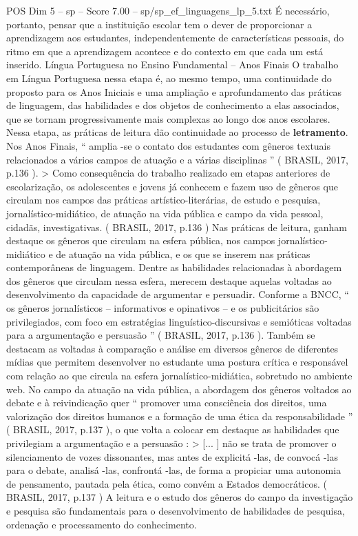 \begin{textsample}{POS Dim 5 – sp – Score 7.00 – sp/sp\_ef\_linguagens\_lp\_5.txt}
É necessário, portanto, pensar que a instituição escolar tem o dever de proporcionar a aprendizagem aos estudantes, independentemente de características pessoais, do ritmo em que a aprendizagem acontece e do contexto em que cada um está inserido.
Língua Portuguesa no Ensino Fundamental – Anos Finais O trabalho em Língua Portuguesa nessa etapa é, ao mesmo tempo, uma continuidade do proposto para os Anos Iniciais e uma ampliação e aprofundamento das práticas de linguagem, das habilidades e dos objetos de conhecimento a elas associados, que se tornam progressivamente mais complexas ao longo dos anos escolares.
Nessa etapa, as práticas de leitura dão continuidade ao processo de \textbf{letramento}.
Nos Anos Finais, “ amplia -se o contato dos estudantes com gêneros textuais relacionados a vários campos de atuação e a várias disciplinas ” ( BRASIL, 2017, p.136 ). > Como consequência do trabalho realizado em etapas anteriores de escolarização, os adolescentes e jovens já conhecem e fazem uso de gêneros que circulam nos campos das práticas artístico-literárias, de estudo e pesquisa, jornalístico-midiático, de atuação na vida pública e campo da vida pessoal, cidadãs, investigativas. ( BRASIL, 2017, p.136 ) Nas práticas de leitura, ganham destaque os gêneros que circulam na esfera pública, nos campos jornalístico-midiático e de atuação na vida pública, e os que se inserem nas práticas contemporâneas de linguagem.
Dentre as habilidades relacionadas à abordagem dos gêneros que circulam nessa esfera, merecem destaque aquelas voltadas ao desenvolvimento da capacidade de argumentar e persuadir.
Conforme a BNCC, “ os gêneros jornalísticos – informativos e opinativos – e os publicitários são privilegiados, com foco em estratégias linguístico-discursivas e semióticas voltadas para a argumentação e persuasão ” ( BRASIL, 2017, p.136 ).
Também se destacam as voltadas à comparação e análise em diversos gêneros de diferentes mídias que permitem desenvolver no estudante uma postura crítica e responsável com relação ao que circula na esfera jornalístico-midiática, sobretudo no ambiente web.
No campo da atuação na vida pública, a abordagem dos gêneros voltados ao debate e à reivindicação quer “ promover uma consciência dos direitos, uma valorização dos direitos humanos e a formação de uma ética da responsabilidade ” ( BRASIL, 2017, p.137 ), o que volta a colocar em destaque as habilidades que privilegiam a argumentação e a persuasão : > [... ] não se trata de promover o silenciamento de vozes dissonantes, mas antes de explicitá -las, de convocá -las para o debate, analisá -las, confrontá -las, de forma a propiciar uma autonomia de pensamento, pautada pela ética, como convém a Estados democráticos. ( BRASIL, 2017, p.137 ) A leitura e o estudo dos gêneros do campo da investigação e pesquisa são fundamentais para o desenvolvimento de habilidades de pesquisa, ordenação e processamento do conhecimento.

\end{textsample}
